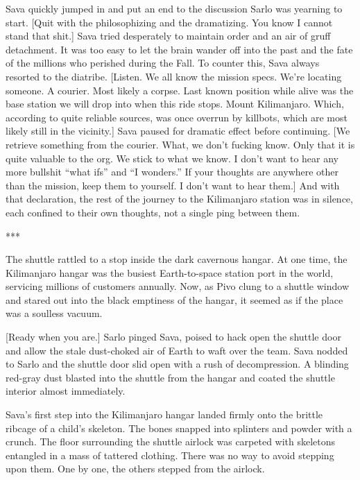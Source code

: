 Sava quickly jumped in and put an end to the discussion Sarlo was
yearning to start. [Quit with the philosophizing and the
dramatizing. You know I cannot stand that shit.] Sava tried
desperately to maintain order and an air of gruff detachment. It was
too easy to let the brain wander off into the past and the fate of the
millions who perished during the Fall. To counter this, Sava always
resorted to the diatribe. [Listen. We all know the mission
specs. We're locating someone. A courier. Most likely a corpse. Last
known position while alive was the base station we will drop into when
this ride stops. Mount Kilimanjaro.  Which, according to quite
reliable sources, was once overrun by killbots, which are most likely
still in the vicinity.] Sava paused for dramatic effect before
continuing. [We retrieve something from the courier. What, we don't
fucking know. Only that it is quite valuable to the org. We stick to
what we know. I don't want to hear any more bullshit ``what ifs'' and ``I
wonders.'' If your thoughts are anywhere other than the mission, keep
them to yourself. I don't want to hear them.]  And with that
declaration, the rest of the journey to the Kilimanjaro station was in
silence, each confined to their own thoughts, not a single ping
between them.

\begin{center}
  ***
\end{center}

The shuttle rattled to a stop inside the dark cavernous hangar. At one
time, the Kilimanjaro hangar was the busiest Earth-to-space station
port in the world, servicing millions of customers annually. Now, as
Pivo clung to a shuttle window and stared out into the black emptiness
of the hangar, it seemed as if the place was a soulless vacuum.

[Ready when you are.] Sarlo pinged Sava, poised to hack open the
shuttle door and allow the stale dust-choked air of Earth to waft over
the team. Sava nodded to Sarlo and the shuttle door slid open with a
rush of decompression. A blinding red-gray dust blasted into the
shuttle from the hangar and coated the shuttle interior almost
immediately.

Sava's first step into the Kilimanjaro hangar landed firmly onto the
brittle ribcage of a child's skeleton.  The bones snapped into
splinters and powder with a crunch. The floor surrounding the shuttle
airlock was carpeted with skeletons entangled in a mass of tattered
clothing. There was no way to avoid stepping upon them. One by one,
the others stepped from the airlock.

